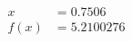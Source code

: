 \documentclass[preview]{standalone}
\begin{document}
\begin{align*}
x &= 0.7506\\f(x) &= 5.2100276
\end{align*}
\end{document}
